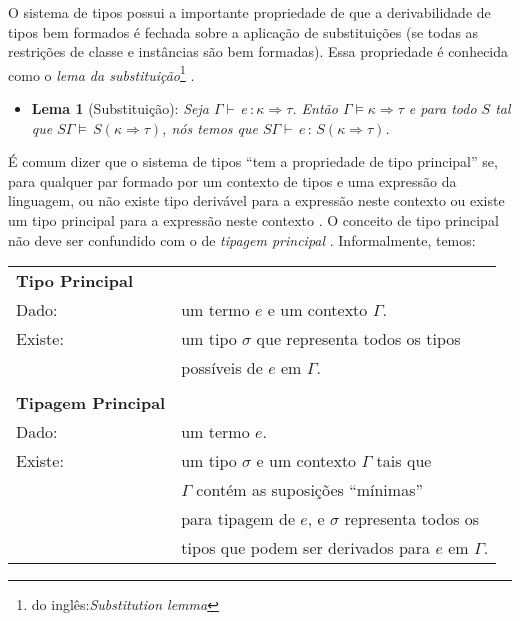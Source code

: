 O sistema de tipos possui a importante propriedade de que a derivabilidade de tipos bem formados \'e fechada sobre a 
aplica\c{c}\~ao de substitui\c{c}\~oes (se todas as restri\c{c}\~oes de classe e inst\^ancias s\~ao bem formadas). 
Essa propriedade \'e conhecida como o \emph{lema da substitui\c{c}\~ao}\footnote{do ingl\^es:\emph{Substitution lemma}}
\cite{Mitchell96}.
\begin{itemize}
	\item[\ ] \textbf{Lema 1} (Substitui\c{c}\~ao): \emph{Seja $\Gamma\vdash\,e\,:\kappa\Rightarrow\tau$. Ent\~ao
	          $\Gamma\models\kappa\Rightarrow\tau$ e para todo $S$ tal que $S\Gamma\models\,S(\kappa\Rightarrow\tau)$,
	          n\'os temos que $S\Gamma\vdash\,e\,:\,S(\kappa\Rightarrow\tau)$.}
\end{itemize}

\'E comum dizer que o sistema de tipos ``tem a propriedade de tipo principal'' se, para qualquer par formado por um
contexto de tipos e uma express\~ao da linguagem, ou n\~ao existe tipo deriv\'avel para a express\~ao neste contexto ou
existe um tipo principal para a express\~ao neste contexto \cite{Damas82, Faxen03}. O conceito de tipo principal n\~ao
deve ser confundido com o de \emph{tipagem principal} \cite{Wells02, Trevor96}. Informalmente, temos:
\begin{center}
\begin{tabular}{ll}
	\textbf{Tipo Principal} & \\
	Dado:                   & um termo $e$ e um contexto $\Gamma$.\\
	Existe:                 & um tipo $\sigma$ que representa todos os tipos\\
	                        & poss\'iveis de $e$ em $\Gamma$.\\
	                        & \\
	\textbf{Tipagem Principal} & \\
	Dado:                      & um termo $e$.\\
	Existe:                    & um tipo $\sigma$ e um contexto $\Gamma$ tais que\\
	                           & $\Gamma$ cont\'em as suposi\c{c}\~oes ``m\'inimas''\\
	                           & para tipagem de $e$, e $\sigma$ representa todos os\\
	                           & tipos que podem ser derivados para $e$ em $\Gamma$.	
\end{tabular}
\end{center}

